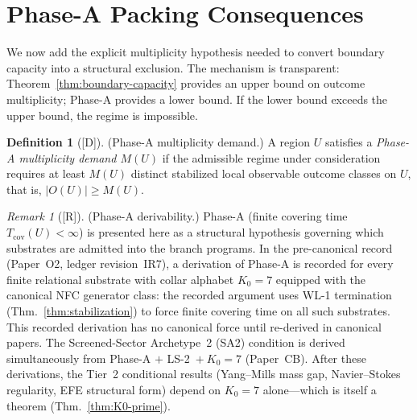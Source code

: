 \documentclass[12pt,oneside]{amsbook}
\theoremstyle{plain}
\theoremstyle{definition}
\newtheorem{definition}[theorem]{Definition}
\theoremstyle{remark}
\newtheorem{remark}[theorem]{Remark}
\newcommand{\status}[1]{\textup{[#1]}}
\begin{document}
\section{Phase-A Packing Consequences}
\label{sec:packing}

We now add the explicit multiplicity hypothesis needed to convert
boundary capacity into a structural exclusion.  The mechanism is
transparent: Theorem~\ref{thm:boundary-capacity} provides an upper
bound on outcome multiplicity; Phase-A provides a lower bound.  If the
lower bound exceeds the upper bound, the regime is impossible.

\begin{definition}[\status{D}]\label{def:phase-a-demand}
\textup{(Phase-A multiplicity demand.)}  A region $U$ satisfies a
\emph{Phase-A multiplicity demand $M(U)$} if the admissible regime
under consideration requires at least $M(U)$ distinct stabilized local
observable outcome classes on $U$, that is, $|O(U)| \geq M(U)$.
\end{definition}


\begin{remark}[\status{R}]
\textup{(Phase-A derivability.)}
Phase-A (finite covering time $T_{\mathrm{cov}}(U) < \infty$) is
presented here as a structural hypothesis governing which substrates
are admitted into the branch programs.  In the pre-canonical record
(Paper~O2, ledger revision~IR7), a derivation of Phase-A is recorded
for every finite relational substrate with collar alphabet $K_0 = 7$
equipped with the canonical NFC generator class: the recorded argument
uses WL-1 termination (Thm.~\ref{thm:stabilization}) to force finite
covering time on all such substrates.  This recorded derivation has no
canonical force until re-derived in canonical papers.  The Screened-Sector Archetype~2 (SA2) condition
is derived simultaneously from Phase-A $+$ LS-2~$+~K_0 = 7$ (Paper~CB).
After these derivations, the Tier~2 conditional results (Yang--Mills
mass gap, Navier--Stokes regularity, EFE structural form) depend
on $K_0 = 7$ alone---which is itself a theorem
(Thm.~\ref{thm:K0-prime}).
\end{remark}
\end{document}
